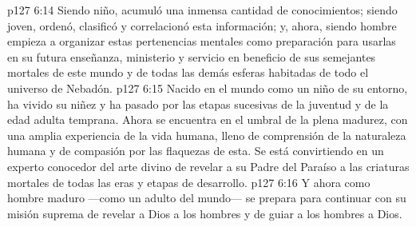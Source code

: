 \vs p127 6:14 Siendo niño, acumuló una inmensa cantidad de conocimientos; siendo joven, ordenó, clasificó y correlacionó esta información; y, ahora, siendo hombre empieza a organizar estas pertenencias mentales como preparación para usarlas en su futura enseñanza, ministerio y servicio en beneficio de sus semejantes mortales de este mundo y de todas las demás esferas habitadas de todo el universo de Nebadón.
\vs p127 6:15 Nacido en el mundo como un niño de su entorno, ha vivido su niñez y ha pasado por las etapas sucesivas de la juventud y de la edad adulta temprana. Ahora se encuentra en el umbral de la plena madurez, con una amplia experiencia de la vida humana, lleno de comprensión de la naturaleza humana y de compasión por las flaquezas de esta. Se está convirtiendo en un experto conocedor del arte divino de revelar a su Padre del Paraíso a las criaturas mortales de todas las eras y etapas de desarrollo.
\vs p127 6:16 Y ahora como hombre maduro ---como un adulto del mundo--- se prepara para continuar con su misión suprema de revelar a Dios a los hombres y de guiar a los hombres a Dios.
